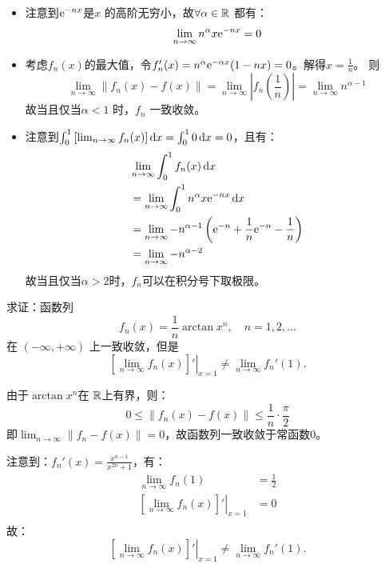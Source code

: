 \begin{solution}
    \begin{itemize}
        \item 注意到\(\mathrm{e}^{-nx}\)是\(x\) 的高阶无穷小，故\(\forall \alpha
            \in \mathbb{R}\) 都有： \[
                \lim_{n \to \infty} n^{\alpha} x \mathrm{e}^{-n x} = 0
            \]
        \item 考虑\(f_{n}(x)\)的最大值，令\(f_{n}'(x) = n^{\alpha}
            \mathrm{e}^{-\alpha x} (1 - n x) = 0\)。解得\(x =
            \frac{1}{n}\)。
            则\[
                \lim_{n \to \infty} \left\lVert f_{n}(x) - f(x)
                \right\rVert = \lim_{n \to \infty} \left|
                f_{n}\left(\frac{1}{n}\right) \right| = \lim_{n \to
                \infty} n^{\alpha - 1}
            \]
            故当且仅当\(\alpha <  1\) 时，\(f_{n}\) 一致收敛。
        \item 注意到\(\int_0^1 \left[ \lim_{n \to \infty} f_n(x) \right]
            \d{x} = \int_0^1 0 \d{x} = 0\)，且有：
            \begin{align*}
                & \lim_{n \to \infty} \int_0^1 f_n(x) \d{x} \\
                & = \lim_{n \to \infty} \int_{0}^{1} n^{\alpha} x
                \e^{-nx} \d{x}                       \\
                & = \lim_{n \to \infty} -n^{\alpha - 1} \left(
                    \e^{-n} + \frac{1}{n}\e^{-n}
                -\frac{1}{n} \right)                               \\
                & = \lim_{n \to \infty} -n^{\alpha - 2}
            \end{align*}
            故当且仅当\(\alpha > 2\)时，\(f_{n}\)可以在积分号下取极限。
    \end{itemize}
\end{solution}

\begin{problem}
    求证：函数列
    \[
        f_n(x) = \frac{1}{n} \arctan x^n, \quad n = 1, 2, \dots
    \]
    在 \((-\infty, +\infty)\) 上一致收敛，但是
    \[
        \left. \left[ \lim_{n \to \infty} f_n(x) \right]'
        \right|_{x = 1}
        \neq \lim_{n \to \infty} f_n'(1).
    \]
\end{problem}

\begin{solution}
    由于\(\arctan x^{n}\)在 \(\mathbb{R}\)上有界，则：
    \[
        0 \le  \left\lVert f_{n}(x) - f(x) \right\rVert \le
        \frac{1}{n} \cdot \frac{\pi}{2}
    \]
    即\(\lim_{n \to \infty} \left\lVert f_{n} - f(x) \right\rVert =
    0\)，故函数列一致收敛于常函数\(0\)。

    注意到：\(f_{n}'(x) = \frac{x^{n - 1}}{x^{2n} + 1}\)，有：
    \begin{align*}
        \lim_{n \to \infty} f_{n}(1) & = \frac{1}{2} \\
        \left. \left[ \lim_{n \to \infty} f_{n}(x) \right]'
        \right|_{x=1}                & = 0           \\
    \end{align*}
    故： \[
        \left. \left[ \lim_{n \to \infty} f_n(x) \right]'
        \right|_{x = 1}
        \neq \lim_{n \to \infty} f_n'(1).
    \]
\end{solution}


